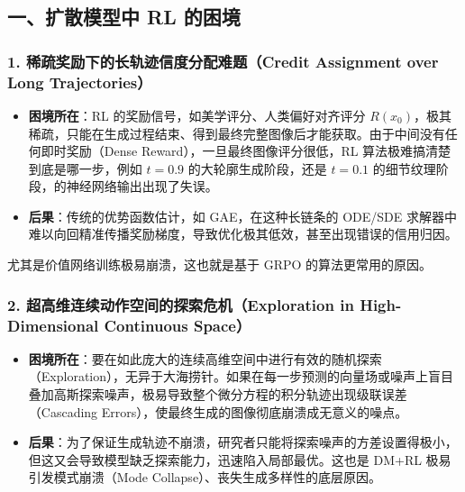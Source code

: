 \hypertarget{ux4e00ux6269ux6563ux6a21ux578bux4e2d-rl-ux7684ux56f0ux5883}{%
\subsection{一、扩散模型中 RL 的困境}\label{ux4e00ux6269ux6563ux6a21ux578bux4e2d-rl-ux7684ux56f0ux5883}}

\hypertarget{ux7a00ux758fux5956ux52b1ux4e0bux7684ux957fux8f68ux8ff9ux4fe1ux5ea6ux5206ux914dux96beux9898credit-assignment-over-long-trajectories}{%
\subsubsection{1. 稀疏奖励下的长轨迹信度分配难题（Credit Assignment over Long Trajectories）}\label{ux7a00ux758fux5956ux52b1ux4e0bux7684ux957fux8f68ux8ff9ux4fe1ux5ea6ux5206ux914dux96beux9898credit-assignment-over-long-trajectories}}

\begin{itemize}
\tightlist
\item
  \textbf{困境所在}：RL 的奖励信号，如美学评分、人类偏好对齐评分 \(R(x_0)\)，极其稀疏，只能在生成过程结束、得到最终完整图像后才能获取。由于中间没有任何即时奖励（Dense Reward），一旦最终图像评分很低，RL 算法极难搞清楚到底是哪一步，例如 \(t=0.9\) 的大轮廓生成阶段，还是 \(t=0.1\) 的细节纹理阶段，的神经网络输出出现了失误。
\item
  \textbf{后果}：传统的优势函数估计，如 GAE，在这种长链条的 ODE/SDE 求解器中难以向回精准传播奖励梯度，导致优化极其低效，甚至出现错误的信用归因。
\end{itemize}

尤其是价值网络训练极易崩溃，这也就是基于 GRPO 的算法更常用的原因。

\hypertarget{ux8d85ux9ad8ux7ef4ux8fdeux7eedux52a8ux4f5cux7a7aux95f4ux7684ux63a2ux7d22ux5371ux673aexploration-in-high-dimensional-continuous-space}{%
\subsubsection{2. 超高维连续动作空间的探索危机（Exploration in High-Dimensional Continuous Space）}\label{ux8d85ux9ad8ux7ef4ux8fdeux7eedux52a8ux4f5cux7a7aux95f4ux7684ux63a2ux7d22ux5371ux673aexploration-in-high-dimensional-continuous-space}}

\begin{itemize}
\tightlist
\item
  \textbf{困境所在}：要在如此庞大的连续高维空间中进行有效的随机探索（Exploration），无异于大海捞针。如果在每一步预测的向量场或噪声上盲目叠加高斯探索噪声，极易导致整个微分方程的积分轨迹出现级联误差（Cascading Errors），使最终生成的图像彻底崩溃成无意义的噪点。
\item
  \textbf{后果}：为了保证生成轨迹不崩溃，研究者只能将探索噪声的方差设置得极小，但这又会导致模型缺乏探索能力，迅速陷入局部最优。这也是 DM+RL 极易引发模式崩溃（Mode Collapse）、丧失生成多样性的底层原因。
\end{itemize}

